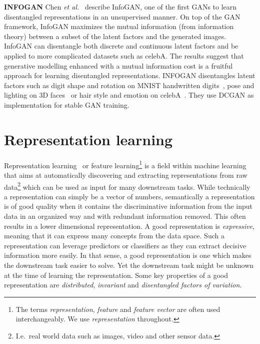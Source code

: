 \documentclass[a4paper,12pt]{report}
\begin{document}
\par\textbf{INFOGAN} Chen \textit{et al.}~\cite{InfoGAN} describe InfoGAN, one of the first GANs to learn disentangled representations in an unsupervised manner. On top of the GAN framework, InfoGAN maximizes the mutual information (from information theory) between a subset of the latent factors and the generated images. InfoGAN can disentangle both discrete and continuous latent factors and be applied to more complicated datasets such as celebA. The results suggest that generative modelling enhanced with a mutual information cost is a fruitful approach for learning disentangled representations. INFOGAN disentangles latent factors such as digit shape and rotation on MNIST handwritten digits~\cite{MNIST}, pose and lighting on 3D faces~\cite{3dFaces} or hair style and emotion on celebA~\cite{celebA}. They use DCGAN as implementation for stable GAN training. 



\section{Representation learning}
Representation learning~\cite{ReprLearning} or feature learning\footnote{The terms \textit{representation}, \textit{feature} and \textit{feature vector} are often used interchangeably. We use \textit{representation} throughout.} is a field within machine learning that aims at automatically discovering and extracting representations from raw data\footnote{I.e.\ real world data such as images, video and other sensor data.} which can be used as input for many downstream tasks. While technically a representation can simply be a vector of numbers, semantically a representation is of good quality when it contains the discriminative information from the input data in an organized way and with redundant information removed. This often results in a lower dimensional representation. A good representation is \textit{expressive}, meaning that it can express many concepts from the data space. Such a representation can leverage predictors or classifiers as they can extract decisive information more easily. In that sense, a good representation is one which makes the downstream task easier to solve. Yet the downstream task might be unknown at the time of learning the representation. Some key properties of a good representation are \textit{distributed}, \textit{invariant} and \textit{disentangled factors of variation}.
\end{document}

